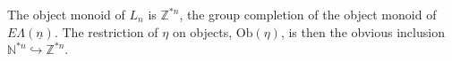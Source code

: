\documentclass{amsbook} %
\newcommand{\ELn}{E\Lambda(\underline{n})}
\newenvironment{eq*}{\begin{equation*}}{\end{equation*}}
\numberwithin{section}{chapter}
\begin{document}
\begin{cor}\label{Zobj}
The object monoid of $L_n$ is $\mathbb{Z}^{*n}$, the group completion of the object monoid of $\ELn$. The restriction of $\eta$ on objects, $\mathrm{Ob}(\eta)$, is then the obvious inclusion $\mathbb{N}^{*n} \hookrightarrow \mathbb{Z}^{*n}$.
\end{cor}



%
\end{document}
